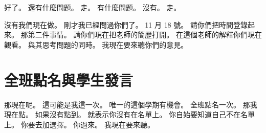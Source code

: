 \hypertarget{c01:cue:1940}{}好了。
\hypertarget{c01:cue:1941}{}還有什麼問題。
\hypertarget{c01:cue:1942}{}走。
\hypertarget{c01:cue:1943}{}有什麼問題。
\hypertarget{c01:cue:1944}{}沒有。
\hypertarget{c01:cue:1945}{}走。

\hypertarget{c01:cue:1946}{}沒有我們現在做。
\hypertarget{c01:cue:1947}{}剛才我已經問過你們了。
\hypertarget{c01:cue:1948}{}11 月 18 號。
\hypertarget{c01:cue:1949}{}請你們把時間登錄起來。
\hypertarget{c01:cue:1950}{}那第二件事情。
\hypertarget{c01:cue:1951}{}請你們現在把老師的簡歷打開。
\hypertarget{c01:cue:1952}{}在這個老師的解釋你們現在觀看。
\hypertarget{c01:cue:1953}{}與其思考問題的同時。
\hypertarget{c01:cue:1954}{}我現在要來聽你們的意見。

\section{全班點名與學生發言}

\hypertarget{c01:cue:1955}{}那現在呢。
\hypertarget{c01:cue:1956}{}這可能是我這一次。
\hypertarget{c01:cue:1957}{}唯一的這個學期有機會。
\hypertarget{c01:cue:1958}{}全班點名一次。
\hypertarget{c01:cue:1959}{}那我現在點。
\hypertarget{c01:cue:1960}{}如果沒有點到。
\hypertarget{c01:cue:1961}{}就表示你沒有在名單上。
\hypertarget{c01:cue:1962}{}你自始要知道自己不在名單上。
\hypertarget{c01:cue:1963}{}你要去加選擇。
\hypertarget{c01:cue:1964}{}你過來。
\hypertarget{c01:cue:1965}{}我現在要來聽。

